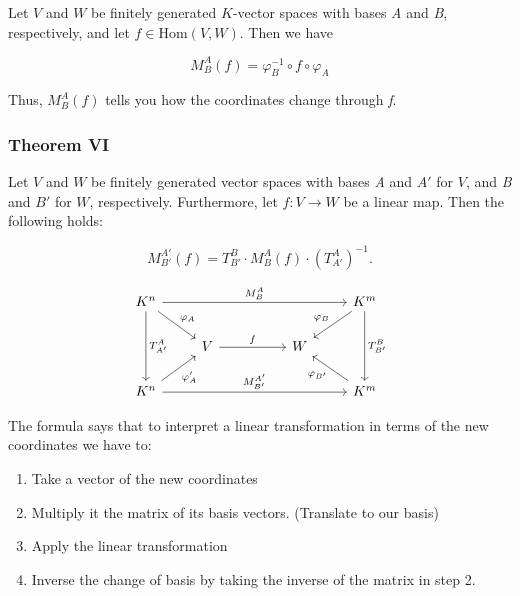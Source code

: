 Let \( V \) and \( W \) be finitely generated \( K \)-vector spaces with 
bases \emph{A} and \emph{B}, respectively, and let \( f \in \mathrm{Hom}(V, W) \).
Then we have

\[
    M_B^A(f) = \varphi_B^{-1} \circ f \circ \varphi_A
\]

Thus, \( M_B^A(f) \) tells you how the coordinates change through \emph{f}.

\subsubsection{Theorem VI} 

Let \( V \) and \( W \) be finitely generated vector spaces with bases \emph{A} and \( A' \) 
for \( V \), and \emph{B} and \( B' \) for \( W \), respectively.  Furthermore, let \( f: V \to W \) be 
a linear map. Then the following holds:

\[
    M_{B'}^{A'}(f) = T_{B'}^{B} \cdot M_{B}^{A}(f) \cdot {\left( T_{A'}^{A} \right)}^{-1}.
\]

\[
    \begin{tikzcd}
        K^n \arrow[dd, "T_{A'}^{A}"] \arrow[rrrr, "M_{B}^{A}"] \arrow[rd, "\varphi_A"] &                   &  &   & K^m \arrow[dd, "T_{B'}^{B}"] \arrow[ld, "\varphi_B"'] \\
                                                                                       & V \arrow[rr, "f"] &  & W &                                                       \\
        K^n \arrow[rrrr, "M_{B'}^{A'}"] \arrow[ru, "\varphi_{A}'"']                    &                   &  &   & K^m \arrow[lu, "\varphi_{B'}"]                       
    \end{tikzcd}
\]

The formula says that to interpret a linear transformation in terms of the
new coordinates we have to:

\begin{enumerate}
    \item Take a vector of the new coordinates
    \item Multiply it the matrix of its basis vectors. (Translate to our basis)
    \item Apply the linear transformation
    \item Inverse the change of basis by taking the inverse of the 
    matrix in step 2.
\end{enumerate}
